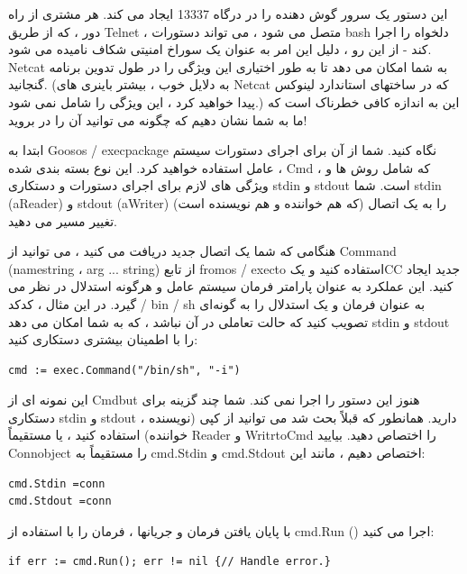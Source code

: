\documentclass[12pt]{book}
\begin{document}
{این دستور یک سرور گوش دهنده را در درگاه 13337 ایجاد می کند. هر مشتری از راه دور ، که از طریق Telnet ، متصل می شود ، می تواند دستورات bash دلخواه را اجرا کند - از این رو ، دلیل این امر به عنوان یک سوراخ امنیتی شکاف نامیده می شود. Netcat به شما امکان می دهد تا به طور اختیاری این ویژگی را در طول تدوین برنامه گنجانید. (به دلایل خوب ، بیشتر باینری های Netcat که در ساختهای استاندارد لینوکس پیدا خواهید کرد ، این ویژگی را شامل نمی شود.) این به اندازه کافی خطرناک است که ما به شما نشان دهیم که چگونه می توانید آن را در بروید!

ابتدا به Goosos / execpackage نگاه کنید. شما از آن برای اجرای دستورات سیستم عامل استفاده خواهید کرد. این نوع بسته بندی شده ، Cmd ، که شامل روش ها و ویژگی های لازم برای اجرای دستورات و دستکاری stdin و stdout است. شما stdin (aReader) و stdout (aWriter) را به یک اتصال (که هم خواننده و هم نویسنده است) تغییر مسیر می دهید.

هنگامی که شما یک اتصال جدید دریافت می کنید ، می توانید از Command (namestring ، arg ... string) از تابع fromos / execto استفاده کنید و یکCC جدید ایجاد کنید. این عملکرد به عنوان پارامتر فرمان سیستم عامل و هرگونه استدلال در نظر می گیرد. در این مثال ، کدکد / bin / sh به عنوان فرمان و یک استدلال را به گونه‌ای تصویب کنید که حالت تعاملی در آن نباشد ، که به شما امکان می دهد stdin و stdout را با اطمینان بیشتری دستکاری کنید:
\begin{latin}
	\begin{lstlisting}
cmd := exec.Command("/bin/sh", "-i")
	\end{lstlisting}
\end{latin}

این نمونه ای از Cmdbut هنوز این دستور را اجرا نمی کند. شما چند گزینه برای دستکاری stdin و stdout دارید. همانطور که قبلاً بحث شد می توانید از کپی (نویسنده ، خواننده) استفاده کنید ، یا مستقیماً Reader و WritrtoCmd را اختصاص دهید. بیایید Connobject را مستقیماً به cmd.Stdin و cmd.Stdout اختصاص دهیم ، مانند این:
\begin{latin}
	\begin{lstlisting}
cmd.Stdin =conn
cmd.Stdout =conn
	\end{lstlisting}
\end{latin}

با پایان یافتن فرمان و جریانها ، فرمان را با استفاده از cmd.Run () اجرا می کنید:
\begin{latin}
	\begin{lstlisting}
if err := cmd.Run(); err != nil {// Handle error.}
	\end{lstlisting}
\end{latin}

}
\end{document}
